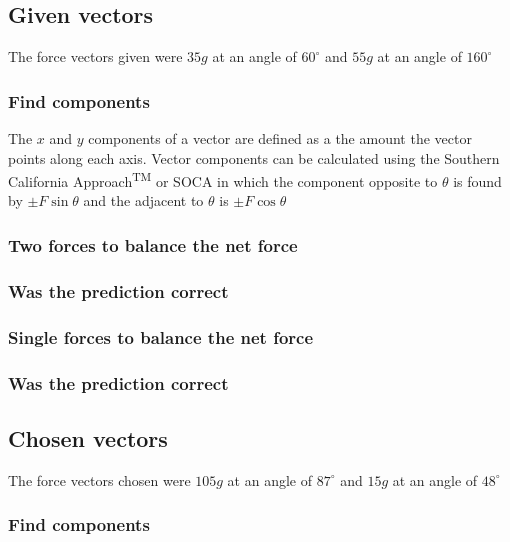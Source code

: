\documentclass[11pt, letterpaper, includehead]{article}
\begin{document}
\subsection{Given vectors} %
The force vectors given were $35g$ at an angle of $60^{\circ}$ and $55g$ at an angle of $160^{\circ}$

\subsubsection{Find components} %
The $x$ and $y$ components of a vector are defined as a the amount the vector 
points along each axis. Vector components can be calculated using the Southern 
California Approach\textsuperscript{TM} or SOCA in which the component opposite to
$\theta$ is found by $\pm F \sin\theta$ and the adjacent to $\theta$ is $\pm F \cos\theta$

\subsubsection{Two forces to balance the net force} %

\subsubsection{Was the prediction correct} %

\subsubsection{Single forces to balance the net force} %

\subsubsection{Was the prediction correct} %

\subsection{Chosen vectors} %
The force vectors chosen were $105g$ at an angle of $87^{\circ}$ and $15g$ at an angle of $48^{\circ}$

\subsubsection{Find components} %
\end{document}
